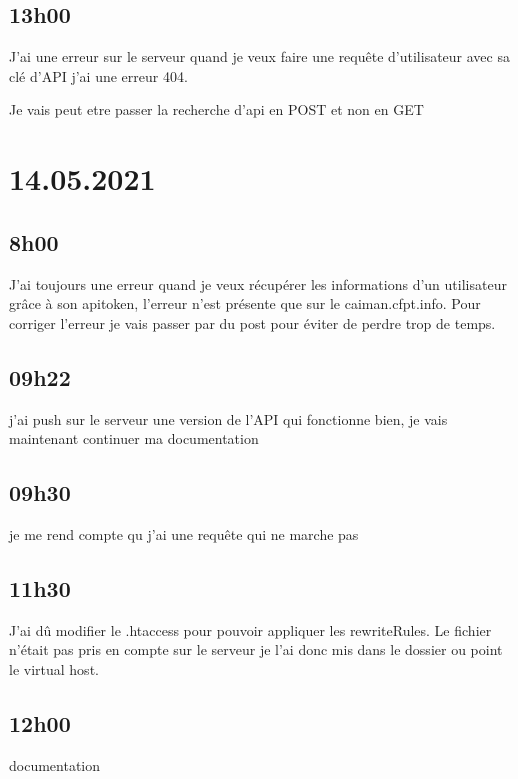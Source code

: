 \documentclass[a4paper,12pt,french]{sphinxmanual}
\begin{document}
\subsection{13h00}
\label{\detokenize{logbook:id112}}
\sphinxAtStartPar
J’ai une erreur sur le serveur quand je veux faire une requête d’utilisateur avec sa clé d’API j’ai une erreur 404.

\sphinxAtStartPar
Je vais peut etre passer la recherche d’api en POST et non en GET


\section{14.05.2021}
\label{\detokenize{logbook:id113}}

\subsection{8h00}
\label{\detokenize{logbook:id114}}
\sphinxAtStartPar
J’ai toujours une erreur quand je veux récupérer les informations d’un utilisateur grâce à son apitoken, l’erreur n’est présente que sur le caiman.cfpt.info.
Pour corriger l’erreur je vais passer par du post pour éviter de perdre trop de temps.


\subsection{09h22}
\label{\detokenize{logbook:h22}}
\sphinxAtStartPar
j’ai push sur le serveur une version de l’API qui fonctionne bien, je vais maintenant continuer ma documentation


\subsection{09h30}
\label{\detokenize{logbook:id115}}
\sphinxAtStartPar
je me rend compte qu j’ai une requête qui ne marche pas


\subsection{11h30}
\label{\detokenize{logbook:id116}}
\sphinxAtStartPar
J’ai dû modifier le .htaccess pour pouvoir appliquer les rewriteRules. Le fichier n’était pas pris en compte sur le serveur je l’ai donc mis dans le dossier ou point le virtual host.


\subsection{12h00}
\label{\detokenize{logbook:id117}}
\sphinxAtStartPar
documentation
\end{document}
